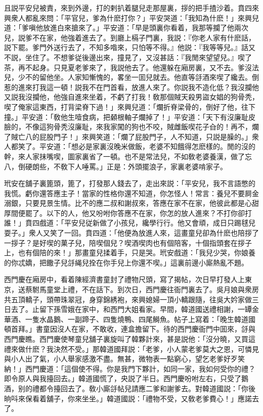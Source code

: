 且説平安兒被責，來到外邊，打的剌扒着腿兒走那屋裏，拶的把手揸沙着。賁四來興衆人都亂來問：「平官兒，爹為什麽打你？」平安哭道：「我知為什麽！」來興兒道：「爹嗔他放進白來搶來了。」平安道：「早是頭裏你看着，我那等攔了他兩次兒，説爹不在家，他強着進去了。到廳上槅子門裏，我説：『你老人家有什麽話，説下罷。爹門外送行去了，不知多喒來，只怕等不得。』他説：『我等等兒。』話又不説，坐住了。不想爹従後邊出來，撞見了，又沒甚話：『我閒來望望兒。』喫了茶，再不起身。只見夏老爹來了，我説他去了。他還躲在廂房裏，又不去。爹沒法兒，少不的留他坐。人家知慚愧的，畧坐一囬兒就去。他直等㧱酒來喫了纔去。倒惹的進來打我這一頓！説我不在門首看，放進人來了。你説我不造化低？我沒攔他又説我沒攔他，他強自進來坐着，不虧了打我！敎那個賊天殺男盜女娼的狗骨秃，喫了俺家這東西，打背梁脊下過！」來興兒道：「爛折脊梁骨的，倒好了他，往下撞。」平安道：「敎他生噎食病，把顙根軸子爛掉了！」平安道：「天下有沒廉耻皮臉的，不像這狗骨秃沒廉耻，來我家闖的狗也不咬，賊雌飯喫花子㒲的！再不，爛了賊亡八的屁股門子！」來興笑道：「爛了屁股門子，人不知道，只説是臊的。」衆人都笑了。平安道：「想必是家裏沒晚米做飯，老婆不知餓得怎麽樣的。閒的沒的幹，來人家抹嘴喫，圖家裏省了一頓。也不是常法兒，不如敎老婆養漢，做了忘八，倒硬朗些，不敎下人唾罵。」正是：外頭擺浪子，家裏老婆啃家子。

玳安在舖子裏篦頭，篦了，打發那人錢去了，走出來説：「平安兒，我不言語憋的我慌。虧你還答應主子！當家的性格你還不知道，你怎怪人！常言：養兒不要屙金溺銀，只要見景生情。比不的應二叔和謝叔來，答應在家不在家，他彼此都是心甜厚間便罷了。以下的人，他又吩咐你答應不在家，你怎的放人進來？不打你卻打誰！」賁四戲道：「平安兒従新做了小孩兒，纔學行行。他又會頑，成日只踢毬兒耍子。」衆人又笑了一回。賁四道：「他便為放進人來，這畫童兒卻為什麽也陪拶了一拶子？是好喫的菓子兒，陪喫個兒？喫酒喫肉也有個陪客，十個指頭套在拶子上，也有個陪的來！」那畫童兒揉着手，只是哭。玳安戲道：「我兒少哭，你娘養的你忒嬌，把饊子兒㧱䋲兒拴在你手兒上你還不喫。」這裏前邊小廝熱亂不題。

西門慶在廂房中，看着陳經濟書童封了禮物尺頭，寫了揭帖，次日早打發人上東京，送蔡駙馬童堂上禮，不在話下。到次日，西門慶往衙門裏去了。吳月娘與衆房共五頂轎子，頭帶珠翠冠，身穿錦綉袍，來興媳婦一頂小轎跟隨，往吳大妗家做三日去了。止留下孫雪娥在家中，和西門大姐看家。早間，韓道國送禮相謝，一罈金華酒、一隻水晶鵝、一副蹄子、四隻燒鴨、四尾鰣魚。帖子上寫着：「晚生韓道國頓首拜。」書童因沒人在家，不敢收，連盒擔留下。待的西門慶衙門中囬來，㧱與西門慶瞧。西門慶使琴童兒舖子裏旋叫了韓夥計來，甚是説他：「沒分曉，又買這禮來做什麽？我決然不受。」那韓道國拜説：「老爹，小人蒙老爹莫大之恩，可憐見與小人出了氣，小人舉家感激不盡。無甚，微物表一點窮心，望乞老爹好歹笑納！」西門慶道：「這個使不得。你是我門下夥計，如同一家，我如何受你的禮？即令原人與我擡回去。」韓道國慌了，央説了半日。西門慶吩咐左右，只受了鵝酒，别的禮都令擡回去了。敎小廝㧱帖兒請應二爹和謝爹去。對韓道國説：「你後晌呌來保看着舖子，你來坐坐。」韓道國説：「禮物不受，又敎老爹費心！」應諾去了。


